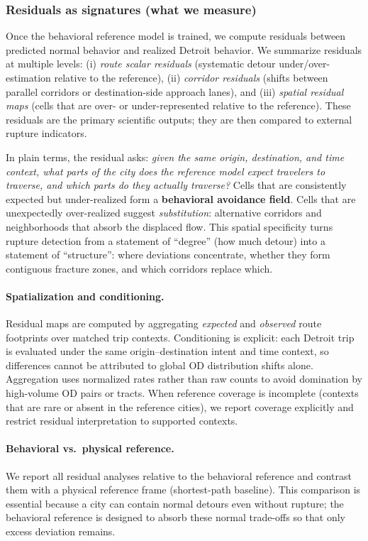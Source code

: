 \subsubsection{Residuals as signatures (what we measure)}
Once the behavioral reference model is trained, we compute residuals between predicted normal behavior and realized Detroit behavior. We summarize residuals at multiple levels:
(i) \emph{route scalar residuals} (systematic detour under/over-estimation relative to the reference),
(ii) \emph{corridor residuals} (shifts between parallel corridors or destination-side approach lanes), and
(iii) \emph{spatial residual maps} (cells that are over- or under-represented relative to the reference).
These residuals are the primary scientific outputs; they are then compared to external rupture indicators.

In plain terms, the residual asks: \emph{given the same origin, destination, and time context, what parts of the city does the reference model expect travelers to traverse, and which parts do they actually traverse?} Cells that are consistently expected but under-realized form a \textbf{behavioral avoidance field}. Cells that are unexpectedly over-realized suggest \emph{substitution}: alternative corridors and neighborhoods that absorb the displaced flow. This spatial specificity turns rupture detection from a statement of ``degree'' (how much detour) into a statement of ``structure'': where deviations concentrate, whether they form contiguous fracture zones, and which corridors replace which.

\paragraph{Spatialization and conditioning.}
Residual maps are computed by aggregating \emph{expected} and \emph{observed} route footprints over matched trip contexts. Conditioning is explicit: each Detroit trip is evaluated under the same origin--destination intent and time context, so differences cannot be attributed to global OD distribution shifts alone. Aggregation uses normalized rates rather than raw counts to avoid domination by high-volume OD pairs or tracts. When reference coverage is incomplete (contexts that are rare or absent in the reference cities), we report coverage explicitly and restrict residual interpretation to supported contexts.

\paragraph{Behavioral vs.\ physical reference.}
We report all residual analyses relative to the behavioral reference and contrast them with a physical reference frame (shortest-path baseline). This comparison is essential because a city can contain normal detours even without rupture; the behavioral reference is designed to absorb these normal trade-offs so that only excess deviation remains.

